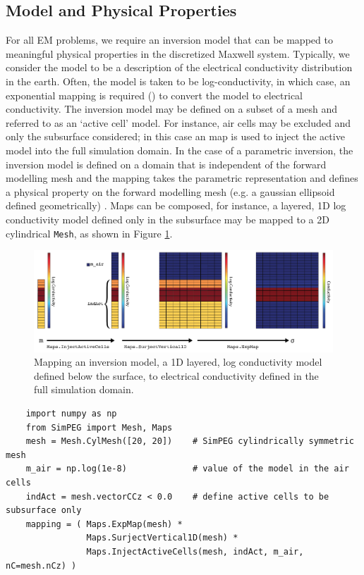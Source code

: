
\subsection{Model and Physical Properties}
\label{sec:ModelPhysProps}

For all EM problems, we require an inversion model
that can be mapped to meaningful physical properties in the discretized
Maxwell system. Typically, we consider the model to be a description of the
electrical conductivity distribution in the earth. Often, the model is taken
to be log-conductivity, in which case, an exponential mapping is required
(\ExpMap) to convert the model to electrical conductivity. The inversion model
may be defined on a subset of a mesh and referred to as an  `active cell' model.
For instance, air cells may be excluded and only the subsurface considered; in
this case an \InjectActiveCells map is used to inject the active model into
the full simulation domain. In the case of a parametric inversion, the
inversion model is defined on a domain that is independent of the forward
modelling mesh and the mapping takes the parametric representation and defines
a physical property on the forward modelling mesh  (e.g. a gaussian ellipsoid
defined geometrically) \citep{MaokunLi2010, Pidlisecky2011, McMillan2015,
Kang2015}. Maps can be composed, for instance, a layered, 1D log conductivity
model defined only in the subsurface may be mapped to a 2D cylindrical
\texttt{Mesh}, as shown in Figure \ref{fig:mapping}.
{%
\begin{figure}[htb!]
    \centering
    \includegraphics[width=\textwidth]{images/mapping}
    \caption{Mapping an inversion model, a 1D layered, log conductivity model defined below the surface, to electrical conductivity defined in the full simulation domain.}
\label{fig:mapping}
\end{figure}
}\noindent
{\scriptsize
\begin{verbatim}
    import numpy as np
    from SimPEG import Mesh, Maps
    mesh = Mesh.CylMesh([20, 20])    # SimPEG cylindrically symmetric mesh
    m_air = np.log(1e-8)             # value of the model in the air cells
    indAct = mesh.vectorCCz < 0.0    # define active cells to be subsurface only
    mapping = ( Maps.ExpMap(mesh) *
                Maps.SurjectVertical1D(mesh) *
                Maps.InjectActiveCells(mesh, indAct, m_air, nC=mesh.nCz) )
\end{verbatim}
}\noindent
